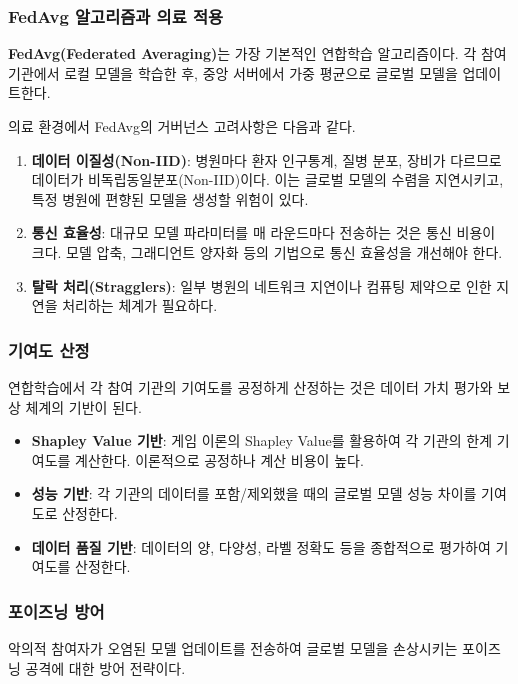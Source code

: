 \subsubsection{FedAvg 알고리즘과 의료 적용}

\textbf{FedAvg(Federated Averaging)}는 가장 기본적인 연합학습 알고리즘이다. 각 참여 기관에서 로컬 모델을 학습한 후, 중앙 서버에서 가중 평균으로 글로벌 모델을 업데이트한다.

의료 환경에서 FedAvg의 거버넌스 고려사항은 다음과 같다.

\begin{enumerate}
 \item \textbf{데이터 이질성(Non-IID)}: 병원마다 환자 인구통계, 질병 분포, 장비가 다르므로 데이터가 비독립동일분포(Non-IID)이다. 이는 글로벌 모델의 수렴을 지연시키고, 특정 병원에 편향된 모델을 생성할 위험이 있다.
 \item \textbf{통신 효율성}: 대규모 모델 파라미터를 매 라운드마다 전송하는 것은 통신 비용이 크다. 모델 압축, 그래디언트 양자화 등의 기법으로 통신 효율성을 개선해야 한다.
 \item \textbf{탈락 처리(Stragglers)}: 일부 병원의 네트워크 지연이나 컴퓨팅 제약으로 인한 지연을 처리하는 체계가 필요하다.
\end{enumerate}

\subsubsection{기여도 산정}

연합학습에서 각 참여 기관의 기여도를 공정하게 산정하는 것은 데이터 가치 평가와 보상 체계의 기반이 된다.

\begin{itemize}
 \item \textbf{Shapley Value 기반}: 게임 이론의 Shapley Value를 활용하여 각 기관의 한계 기여도를 계산한다. 이론적으로 공정하나 계산 비용이 높다.
 \item \textbf{성능 기반}: 각 기관의 데이터를 포함/제외했을 때의 글로벌 모델 성능 차이를 기여도로 산정한다.
 \item \textbf{데이터 품질 기반}: 데이터의 양, 다양성, 라벨 정확도 등을 종합적으로 평가하여 기여도를 산정한다.
\end{itemize}

\subsubsection{포이즈닝 방어}

악의적 참여자가 오염된 모델 업데이트를 전송하여 글로벌 모델을 손상시키는 포이즈닝 공격에 대한 방어 전략이다.

